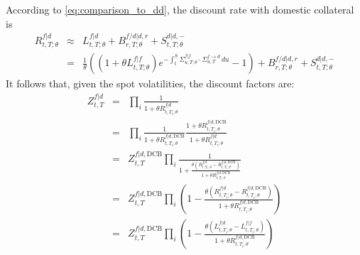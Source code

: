 \documentclass[11pt,english]{amsart}
\newcommand{\DCB}{\mathrm{DCB}}
\theoremstyle{definition}
\begin{document}
According to \autoref{eq:comparison_to_dd}, the discount rate with domestic collateral is 
\begin{eqnarray*}
  R^{f|d}_{t,T;\theta} &\approx& L^{f|d}_{t,T;\theta} + B^{f/d|d,r}_{r,T;\theta} + S^{d|d,-}_{t,T;\theta}  \\
  &=& \frac{1}{\theta}\left( \left( 1 + \theta L^{f|f}_{t,T;\theta} \right) e^{-\int_t^S \Sigma^{f|f}_{u,T;\theta} \cdot \Sigma^{f\to d}_{u,T}\, du } - 1\right) + B^{f/d|d,r}_{r,T;\theta} + S^{d|d,-}_{t,T;\theta}
\end{eqnarray*}
It follows that, given the spot volatilities, the discount factors are:
\begin{eqnarray*}
  Z^{f|d}_{t,T} 
  &=& \prod_i \frac{1}{1+\theta R^{f|d}_{t,T_{i};\theta}}  \\
  &=& \prod_i \frac{1}{1+\theta R^{f|d,\DCB}_{t,T_{i};\theta}} \frac{1+\theta R^{f|d,\DCB}_{t,T_{i};\theta}}{1+\theta R^{f|d}_{t,T_{i};\theta}} \\
  &=& Z^{f|d,\DCB}_{t,T} \prod_i \frac{1}{1+\frac{\theta(R^{f|d}_{t,T_{i};\theta}-R^{f|d,\DCB}_{t,T_{i};\theta})}{1+\theta R^{f|d,\DCB}_{t,T_{i};\theta}}}   \\
   &=& Z^{f|d,\DCB}_{t,T} \prod_i \left(1-\frac{\theta(R^{f|d}_{t,T_{i};\theta}-R^{f|d,\DCB}_{t,T_{i};\theta})}{1+\theta R^{f|d,\DCB}_{t,T_{i};\theta}} \right)  \\
   &=& Z^{f|d,\DCB}_{t,T} \prod_i \left(1-\frac{\theta(L^{f|d}_{t,T_{i};\theta}-L^{f|f}_{t,T_{i};\theta})}{1+\theta R^{f|d,\DCB}_{t,T_{i};\theta}} \right)  
\end{eqnarray*}
\end{document}
